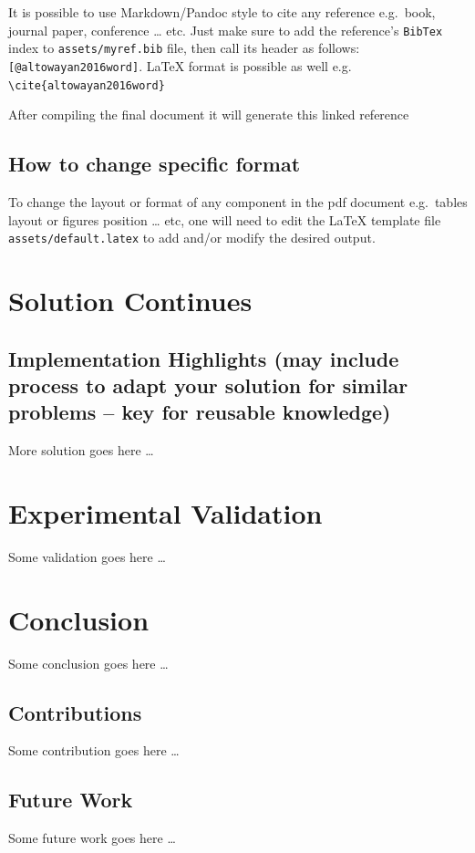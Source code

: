 \documentclass[]{article}
\renewcommand\refname{}         %
\begin{document}
It is possible to use Markdown/Pandoc style to cite any reference
e.g.~book, journal paper, conference \ldots{} etc. Just make sure to add
the reference's \texttt{BibTex} index to \texttt{assets/myref.bib} file,
then call its header as follows: \texttt{{[}@altowayan2016word{]}}.
LaTeX format is possible as well e.g.
\texttt{\textbackslash{}cite\{altowayan2016word\}}

After compiling the final document it will generate this linked
reference \citep{altowayan2016word}

\subsection{How to change specific
format}\label{how-to-change-specific-format}

To change the layout or format of any component in the pdf document
e.g.~tables layout or figures position \ldots{} etc, one will need to
edit the LaTeX template file \texttt{assets/default.latex} to add and/or
modify the desired output.

\section{Solution Continues}\label{solution-continues}

\subsection{Implementation Highlights (may include process to adapt your
solution for similar problems -- key for reusable
knowledge)}\label{implementation-highlights-may-include-process-to-adapt-your-solution-for-similar-problems-key-for-reusable-knowledge}

More solution goes here \ldots{}

\section{Experimental Validation}\label{experimental-validation}

Some validation goes here \ldots{}

\section{Conclusion}\label{conclusion}

Some conclusion goes here \ldots{}

\subsection{Contributions}\label{contributions}

Some contribution goes here \ldots{}

\subsection{Future Work}\label{future-work}

Some future work goes here \ldots{}

\renewcommand\refname{References}

\end{document}
